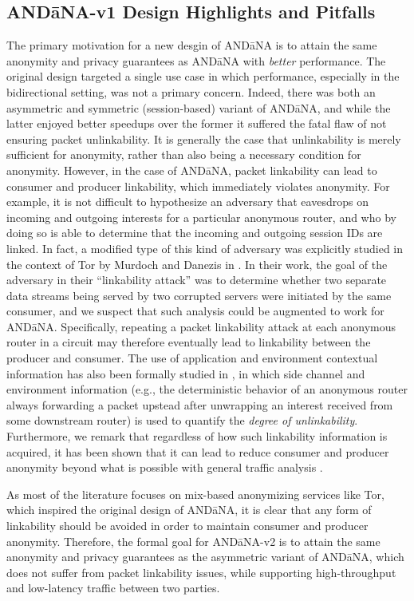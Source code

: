 \subsection{AND\=aNA-v1 Design Highlights and Pitfalls}
The primary motivation for a new desgin of {\sf AND\=aNA} is to attain the same anonymity and privacy guarantees as {\sf AND\=aNA} with \emph{better} performance. The original design targeted a single use case in which performance, especially in the bidirectional setting, was not a primary concern. Indeed, there was both an asymmetric and symmetric (session-based) variant of {\sf AND\=aNA}, and while the latter enjoyed better speedups over the former it suffered the fatal flaw of not ensuring packet unlinkability. It is generally the case that unlinkability is merely sufficient for anonymity, rather than also being a necessary condition for anonymity. However, in the case of {\sf AND\=aNA}, packet linkability can lead to consumer and producer linkability, which immediately violates anonymity. For example, it is not difficult to hypothesize an adversary that eavesdrops on incoming and outgoing interests for a particular anonymous router, and who by doing so is able to determine that the incoming and outgoing session IDs are linked. In fact, a modified type of this kind of adversary was explicitly studied in the context of Tor by Murdoch and Danezis in \cite{tor-traffic-analysis}. In their work, the goal of the adversary in their ``linkability attack'' was to determine whether two separate data streams being served by two corrupted servers were initiated by the same consumer, and we suspect that such analysis could be augmented to work for {\sf AND\=aNA}. Specifically, repeating a packet linkability attack at each anonymous router in a circuit may therefore eventually lead to linkability between the producer and consumer. The use of application and environment contextual information has also been formally studied in \cite{attacking-unlinkability}, in which side channel and environment information (e.g., the deterministic behavior of an anonymous router always forwarding a packet upstead after unwrapping an interest received from some downstream router) is used to quantify the \emph{degree of unlinkability}. Furthermore, we remark that regardless of how such linkability information is acquired, it has been shown that it can lead to reduce consumer and producer anonymity beyond what is possible with general traffic analysis \cite{linkability-attacks}. 

As most of the literature focuses on mix-based anonymizing services like Tor, which inspired the original design of {\sf AND\=aNA}, it is clear that any form of linkability should be avoided in order to maintain consumer and producer anonymity. Therefore, the formal goal for {\sf AND\=aNA-v2} is to attain the same anonymity and privacy guarantees as the asymmetric variant of {\sf AND\=aNA}, which does not suffer from packet linkability issues, while supporting high-throughput and low-latency traffic between two parties. 
